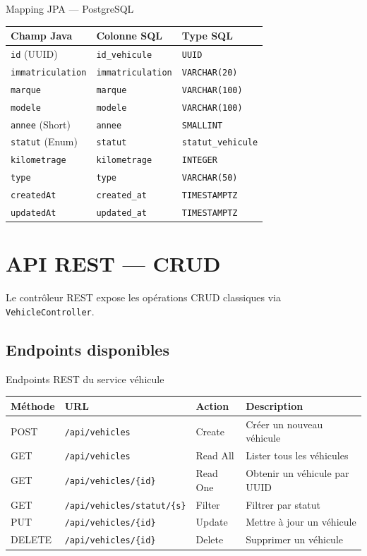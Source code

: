 \documentclass[12pt,a4paper]{report}
\begin{document}
\begin{adrbox}{Mapping JPA --- PostgreSQL}
\begin{tabular}{l l l}
\toprule
\textbf{Champ Java} & \textbf{Colonne SQL} & \textbf{Type SQL} \\
\midrule
\texttt{id} (UUID) & \texttt{id\_vehicule} & \texttt{UUID} \\
\texttt{immatriculation} & \texttt{immatriculation} & \texttt{VARCHAR(20)} \\
\texttt{marque} & \texttt{marque} & \texttt{VARCHAR(100)} \\
\texttt{modele} & \texttt{modele} & \texttt{VARCHAR(100)} \\
\texttt{annee} (Short) & \texttt{annee} & \texttt{SMALLINT} \\
\texttt{statut} (Enum) & \texttt{statut} & \texttt{statut\_vehicule} \\
\texttt{kilometrage} & \texttt{kilometrage} & \texttt{INTEGER} \\
\texttt{type} & \texttt{type} & \texttt{VARCHAR(50)} \\
\texttt{createdAt} & \texttt{created\_at} & \texttt{TIMESTAMPTZ} \\
\texttt{updatedAt} & \texttt{updated\_at} & \texttt{TIMESTAMPTZ} \\
\bottomrule
\end{tabular}
\end{adrbox}

\chapter{API REST --- CRUD}

Le contr\^oleur REST expose les op\'erations CRUD classiques via \texttt{VehicleController}.

\section{Endpoints disponibles}

\begin{adrbox}{Endpoints REST du service v\'ehicule}
\begin{tabularx}{\textwidth}{l l l X}
\toprule
\textbf{M\'ethode} & \textbf{URL} & \textbf{Action} & \textbf{Description} \\
\midrule
POST & \texttt{/api/vehicles} & Create & Cr\'eer un nouveau v\'ehicule \\
GET & \texttt{/api/vehicles} & Read All & Lister tous les v\'ehicules \\
GET & \texttt{/api/vehicles/\{id\}} & Read One & Obtenir un v\'ehicule par UUID \\
GET & \texttt{/api/vehicles/statut/\{s\}} & Filter & Filtrer par statut \\
PUT & \texttt{/api/vehicles/\{id\}} & Update & Mettre \`a jour un v\'ehicule \\
DELETE & \texttt{/api/vehicles/\{id\}} & Delete & Supprimer un v\'ehicule \\
\bottomrule
\end{tabularx}
\end{adrbox}
\end{document}
